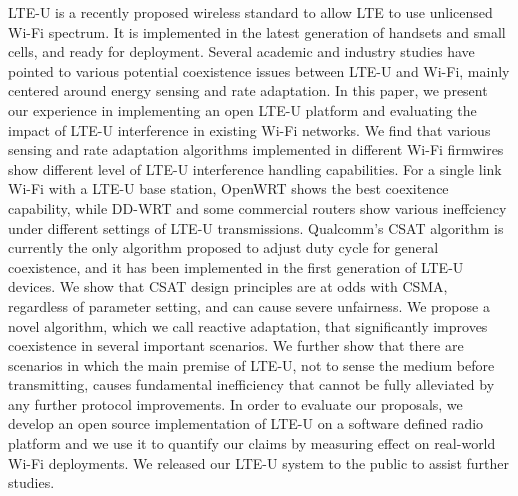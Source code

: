 LTE-U is a recently proposed wireless standard to
allow LTE to use unlicensed Wi-Fi spectrum. It is implemented
in the latest generation of handsets and small cells, and ready for
deployment. Several academic and industry studies have pointed
to various potential coexistence issues between LTE-U and Wi-Fi,
mainly centered around energy sensing and rate adaptation. 
In this paper, we present our experience in implementing 
an open LTE-U platform and evaluating the impact 
of LTE-U interference in existing Wi-Fi networks.
We find that various sensing and rate adaptation algorithms
implemented in different Wi-Fi firmwires show 
different level of LTE-U interference handling capabilities. 
For a single link Wi-Fi with a LTE-U base station, 
OpenWRT shows the best coexitence capability, while
DD-WRT and some commercial routers show various
ineffciency under different settings of LTE-U transmissions. 
Qualcomm’s CSAT algorithm is currently
the only algorithm proposed to adjust duty cycle for general
coexistence, and it has been
implemented in the first generation of LTE-U devices. We show
that CSAT design principles are at odds with CSMA, regardless
of parameter setting, and can cause severe unfairness. We
propose a novel algorithm, which we call reactive adaptation, that
significantly improves coexistence in several important scenarios.
We further show that there are scenarios in which the main
premise of LTE-U, not to sense the medium before transmitting,
causes fundamental inefficiency that cannot be fully alleviated
by any further protocol improvements. In order to evaluate our
proposals, we develop an open source implementation of LTE-U
on a software defined radio platform and we use it to quantify our
claims by measuring effect on real-world Wi-Fi deployments. We
released our LTE-U system to the public to assist further studies.






